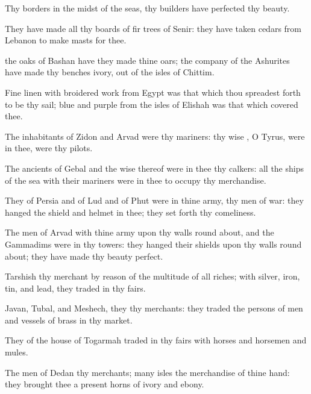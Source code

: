 {Thy
borders
{} in the
midst of the
seas, thy
builders have
perfected thy
beauty.

They have
made all thy
{}
boards of fir
trees of
Senir: they have
taken
cedars from
Lebanon to
make
masts for thee.

 the
oaks of
Bashan have they
made thine
oars; the
company of the
Ashurites have
made thy
benches
{}
ivory,
{} out of the
isles of
Chittim.

Fine
linen with broidered
work from
Egypt was that which thou spreadest
forth to be thy
sail;
blue and
purple from the
isles of
Elishah was that which
covered thee.

The
inhabitants of
Zidon and
Arvad were thy
mariners: thy
wise
{}, O
Tyrus,
{} were in thee, were thy
pilots.

The
ancients of
Gebal and the
wise
{} thereof were in thee thy
calkers: all the
ships of the
sea with their
mariners were in thee to
occupy thy
merchandise.

They of
Persia and of
Lud and of
Phut were in thine
army, thy
men of
war: they
hanged the
shield and
helmet in thee; they set
forth thy
comeliness.

The
men of
Arvad with thine
army
{} upon thy
walls round
about, and the
Gammadims were in thy
towers: they
hanged their
shields upon thy
walls round
about; they have
made thy
beauty
perfect.

Tarshish
{} thy
merchant by reason of the
multitude of all
{}
riches; with
silver,
iron,
tin, and
lead, they
traded in thy
fairs.

Javan,
Tubal, and
Meshech, they
{} thy
merchants: they
traded the
persons of
men and
vessels of
brass in thy
market.

They of the
house of
Togarmah
traded in thy
fairs with
horses and
horsemen and
mules.

The
men of
Dedan
{} thy
merchants;
many
isles
{} the
merchandise of thine
hand: they
brought thee
{} a
present
horns of
ivory and
ebony.

}
